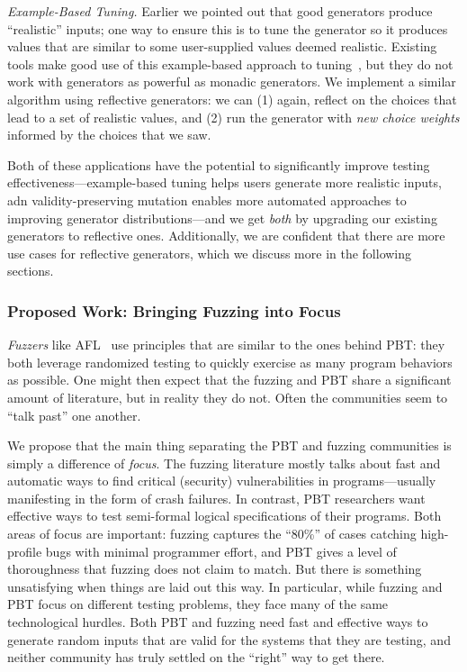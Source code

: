 {\em Example-Based Tuning.} Earlier we pointed out that good generators
produce ``realistic'' inputs; one way to ensure this is to tune the generator so
it produces values that are similar to some user-supplied values deemed
realistic. Existing tools make good use of this example-based approach to
tuning~\cite{soremekun2020inputs}, but they do not work with generators as
powerful as monadic generators. We implement a similar algorithm using
reflective generators: we can (1) again, reflect on the choices that lead to a
set of realistic values, and (2) run the generator with {\em new choice weights}
informed by the choices that we saw.

Both of these applications have the potential to significantly improve testing
effectiveness---example-based tuning helps users generate more realistic inputs,
adn validity-preserving mutation enables more automated approaches to improving
generator distributions---and we get {\em both} by upgrading our existing
generators to reflective ones. Additionally, we are confident that there are
more use cases for reflective generators, which we discuss more in the following
sections.

\subsubsection{Proposed Work: Bringing Fuzzing into Focus}
{\em Fuzzers} like AFL~\cite{afl-readme} use principles that are similar to the
ones behind PBT: they both leverage randomized testing to quickly exercise as
many program behaviors as possible.  One might then expect that the fuzzing and
PBT share a significant amount of literature, but in reality they do not. Often
the communities seem to ``talk past'' one another.

We propose that the main thing separating the PBT and fuzzing communities is
simply a difference of {\em focus}. The fuzzing literature mostly talks about
fast and automatic ways to find critical (security) vulnerabilities in
programs---usually manifesting in the form of crash failures.  In contrast, PBT
researchers want effective ways to test semi-formal logical specifications of
their programs. Both areas of focus are important: fuzzing captures the ``80\%''
of cases catching high-profile bugs with minimal programmer effort, and PBT
gives a level of thoroughness that fuzzing does not claim to match. But there is
something unsatisfying when things are laid out this way. In particular, while
fuzzing and PBT focus on different testing problems, they face many of the same
technological hurdles. Both PBT and fuzzing need fast and effective ways to
generate random inputs that are valid for the systems that they are testing, and
neither community has truly settled on the ``right'' way to get there.

